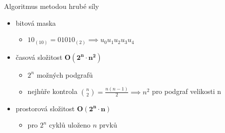 \documentclass[xcolor=dvipsnames,table,10pt]{beamer}
\begin{document}
\begin{frame}{Algoritmus metodou hrub\'e s\'ily}
    \begin{itemize}
        \item bitov\'a maska
        \begin{itemize}
            \item $10_{(10)} = 01010_{(2)} \implies u_{0}u_{1}u_{2}u_{3}u_{4}$\\[10pt]
        \end{itemize}
        \item \v{c}asov\'a slo\v{z}itost $\mathbf{O(2^n\cdot n^2)}$
        \begin{itemize}
            \item $2^n$ mo\v{z}n\'ych podgraf\r{u}
            \item nejh\r{u}\v{r}e kontrola $\binom{n}{2} = \frac{n(n-1)}{2} \implies n^2$ pro podgraf velikosti n\\[10pt]
        \end{itemize}
        \item prostorov\'a slo\v{z}itost $\mathbf{O(2^n\cdot n)}$
        \begin{itemize}
            \item pro $2^n$ cykl\r{u} ulo\v{z}eno $n$ prvk\r{u}
        \end{itemize}
    \end{itemize}
\end{frame}
\end{document}
